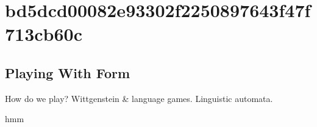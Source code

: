 
\section{bd5dcd00082e93302f2250897643f47f713cb60c}

	\subsection{Playing With Form}
	
	How do we play? Wittgenstein \& language games. Linguistic automata.

	hmm
